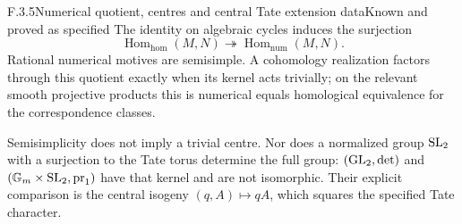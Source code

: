 \begin{result}{F.3.5}{Numerical quotient, centres and central Tate extension data}{Known and proved as specified}
The identity on algebraic cycles induces the surjection
\[
 \operatorname{Hom}_{\mathrm{hom}}(M,N)
 \twoheadrightarrow\operatorname{Hom}_{\mathrm{num}}(M,N).
\]
Rational numerical motives are semisimple. A cohomology realization factors through this quotient exactly when its kernel acts trivially; on the relevant smooth projective products this is numerical equals homological equivalence for the correspondence classes.

Semisimplicity does not imply a trivial centre. Nor does a normalized group $\operatorname{SL}_2$ with a surjection to the Tate torus determine the full group: $(\operatorname{GL}_2,\det)$ and $(\mathbb G_m\times\operatorname{SL}_2,\operatorname{pr}_1)$ have that kernel and are not isomorphic. Their explicit comparison is the central isogeny $(q,A)\mapsto qA$, which squares the specified Tate character.
\end{result}
